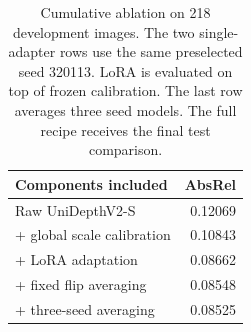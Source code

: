 \begin{table}[t]
\centering\small
\caption{Cumulative ablation on 218 development images. The two single-adapter rows use the same preselected seed 320113. LoRA is evaluated on top of frozen calibration. The last row averages three seed models. The full recipe receives the final test comparison.}
\begin{tabular}{lr}
\toprule
Components included & AbsRel\\
\midrule
Raw UniDepthV2-S & 0.12069\\
+ global scale calibration & 0.10843\\
+ LoRA adaptation & 0.08662\\
+ fixed flip averaging & 0.08548\\
+ three-seed averaging & 0.08525\\
\bottomrule
\end{tabular}
\end{table}
